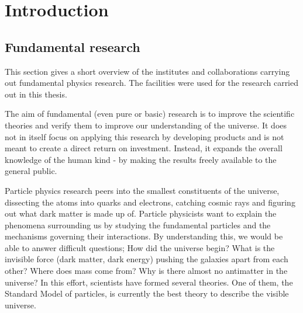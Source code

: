 \documentclass[12pt]{packages/mytustyle}  %
\begin{document}
\baselineskip=15pt



\chapter{Introduction}



\clearpage
\section{Fundamental research}
\label{sec:fundphy}
This section gives a short overview of the institutes and collaborations carrying out fundamental physics research. The facilities were used for the research carried out in this thesis. 

The aim of fundamental (even pure or basic) research is to improve the scientific theories and verify them to improve our understanding of the universe.  It does not in itself focus on applying this research by developing products and is not meant to create a direct return on investment. Instead, it expands the overall knowledge of the human kind - by making the results freely available to the general public.

Particle physics research peers into the smallest constituents of the universe, dissecting the atoms into quarks and electrons, catching cosmic rays and figuring out what dark matter is made up of. Particle physicists want to explain the phenomena surrounding us by studying the fundamental particles and the mechanisms governing their interactions. By understanding this, we would be able to answer difficult questions; How did the universe begin? What is the invisible force (dark matter, dark energy) pushing the galaxies apart from each other? Where does mass come from? Why is there almost no antimatter in the universe? In this effort, scientists have formed several theories. One of them, the Standard Model of particles, is currently the best theory to describe the visible universe.
\end{document}
